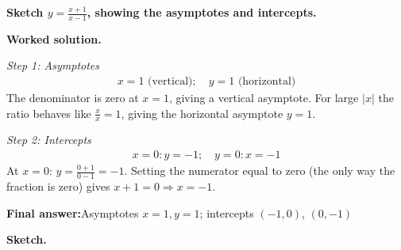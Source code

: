 \documentclass[11pt]{article}
\newcommand{\question}[1]{\par\medskip\noindent\textbf{#1}\par}
\begin{document}
\question{Sketch \( y = \frac{x+1}{x-1} \), showing the asymptotes and intercepts.}

\textbf{Worked solution.}

\textit{Step 1: Asymptotes}
\[\begin{gathered}
x = 1 \text{ (vertical)}; \quad y = 1 \text{ (horizontal)}
\end{gathered}\]
The denominator is zero at \( x = 1 \), giving a vertical asymptote. For large \( |x| \) the ratio behaves like \( \tfrac{x}{x} = 1 \), giving the horizontal asymptote \( y = 1 \).

\textit{Step 2: Intercepts}
\[\begin{gathered}
x = 0: y = -1; \quad y = 0: x = -1
\end{gathered}\]
At \( x = 0 \): \( y = \tfrac{0+1}{0-1} = -1 \). Setting the numerator equal to zero (the only way the fraction is zero) gives \( x + 1 = 0 \Rightarrow x = -1 \).

\begin{answerbox}
\textbf{Final answer:}\quad Asymptotes \(\displaystyle x = 1, y = 1\); intercepts \(\displaystyle (-1,0)\), \(\displaystyle (0,-1)\)
\end{answerbox}
\textbf{Sketch.}
\end{document}
